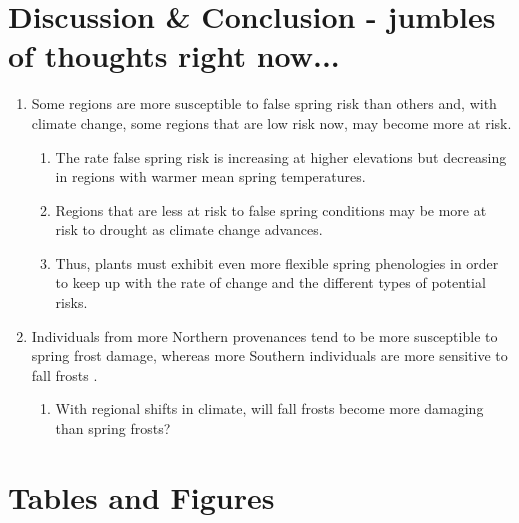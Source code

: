 \documentclass{article}\usepackage[]{graphicx}\usepackage[]{color}
\begin{document}
\section*{Discussion \& Conclusion - jumbles of thoughts right now...}
\begin{enumerate}
\item Some regions are more susceptible to false spring risk than others and, with climate change, some regions that are low risk now, may become more at risk.
\begin{enumerate}
\item The rate false spring risk is increasing at higher elevations but decreasing in regions with warmer mean spring temperatures. 
\item Regions that are less at risk to false spring conditions may be more at risk to drought as climate change advances. 
\item Thus, plants must exhibit even more flexible spring phenologies in order to keep up with the rate of change and the different types of potential risks. 
\end{enumerate}
\item Individuals from more Northern provenances tend to be more susceptible to spring frost damage, whereas more Southern individuals are more sensitive to fall frosts \citep{Montwe2018}.
\begin{enumerate}
\item With regional shifts in climate, will fall frosts become more damaging than spring frosts?
\end{enumerate}
\end{enumerate}



\section*{Tables and Figures} %
\end{document}
